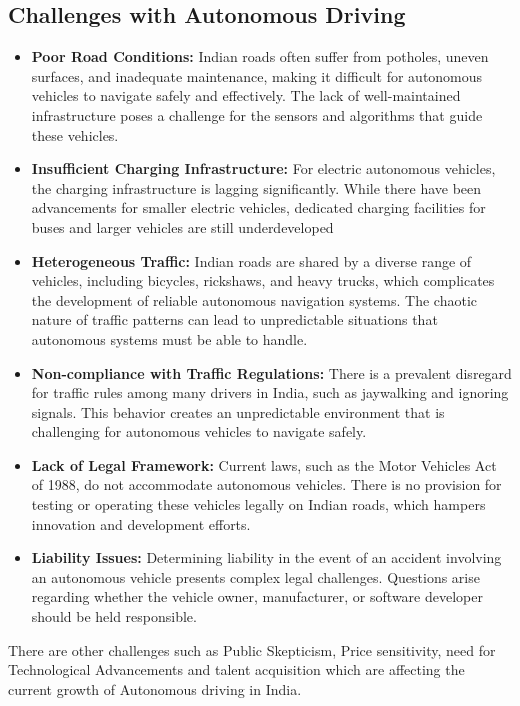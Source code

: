 \documentclass[a4paper,12pt]{report}
\begin{document}
\subsection{Challenges with Autonomous Driving}
\begin{itemize}
    \item \textbf{Poor Road Conditions: }
    Indian roads often suffer from potholes, uneven surfaces, and inadequate maintenance, making it difficult for autonomous vehicles to navigate safely and effectively. The lack of well-maintained infrastructure poses a challenge for the sensors and algorithms that guide these vehicles.
    \item \textbf{Insufficient Charging Infrastructure: }
    For electric autonomous vehicles, the charging infrastructure is lagging significantly. While there have been advancements for smaller electric vehicles, dedicated charging facilities for buses and larger vehicles are still underdeveloped
    \item \textbf{Heterogeneous Traffic: }
    Indian roads are shared by a diverse range of vehicles, including bicycles, rickshaws, and heavy trucks, which complicates the development of reliable autonomous navigation systems. The chaotic nature of traffic patterns can lead to unpredictable situations that autonomous systems must be able to handle.
    \item \textbf{Non-compliance with Traffic Regulations: }
    There is a prevalent disregard for traffic rules among many drivers in India, such as jaywalking and ignoring signals. This behavior creates an unpredictable environment that is challenging for autonomous vehicles to navigate safely.
    \item \textbf{Lack of Legal Framework: }
    Current laws, such as the Motor Vehicles Act of 1988, do not accommodate autonomous vehicles. There is no provision for testing or operating these vehicles legally on Indian roads, which hampers innovation and development efforts.
    \item \textbf{Liability Issues: }
    Determining liability in the event of an accident involving an autonomous vehicle presents complex legal challenges. Questions arise regarding whether the vehicle owner, manufacturer, or software developer should be held responsible.
\end{itemize}
There are other challenges such as Public Skepticism, Price sensitivity, need for Technological Advancements and talent acquisition which are affecting the current growth of Autonomous driving in India. 
\end{document}
